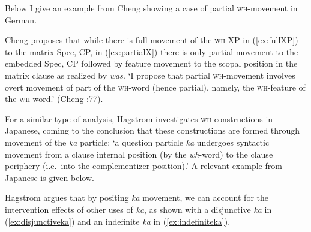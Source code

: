 \documentclass[output=paper,colorlinks,citecolor=brown,
]{langscibook}
\begin{document}
Below I give an example from Cheng \citeyearpar{Cheng:2000b} showing a case of partial \textsc{wh-}movement in German.  

\ea
{}
\z
\z

Cheng proposes that while there is full movement of the \textsc{wh}-XP in (\ref{ex:fullXP}) to the matrix Spec, CP, in (\ref{ex:partialX}) there is only partial movement to the embedded Spec, CP followed by feature movement to the scopal position in the matrix clause as realized by \textit{was}.  `I propose that partial \textsc{wh}-movement involves overt movement of part of the \textsc{wh}-word (hence partial), namely, the \textsc{wh}-feature of the \textsc{wh}-word.' (Cheng \citeyear{Cheng:2000b}:77).

For a similar type of analysis, Hagstrom \citeyearpar{Hagstrom:2000} investigates \textsc{wh}-constructions in Japanese, coming to the conclusion that these constructions are formed through movement of the \textit{ka} particle: `a question particle \textit{ka} undergoes syntactic movement from a clause internal position (by the  \textit{wh}-word) to the clause periphery (i.e.\ into the complementizer position).'
A relevant example from Japanese is given below.

\z

Hagstrom argues that by positing \textit{ka} movement, we can account for the intervention effects of other uses of \textit{ka}, as shown with a disjunctive  \textit{ka} in (\ref{ex:disjunctiveka}) and an indefinite  \textit{ka} in (\ref{ex:indefiniteka}).
\end{document}
